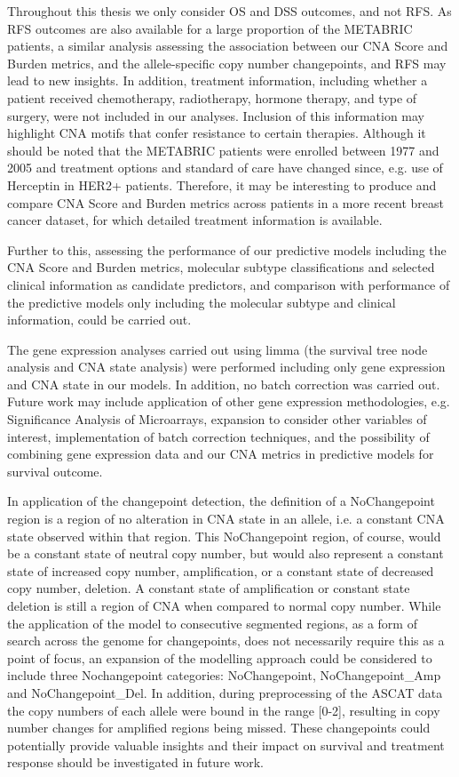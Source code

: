 Throughout this thesis we only consider OS and DSS outcomes, and not RFS. As RFS outcomes are also available for a large proportion of the METABRIC patients, a similar analysis assessing the association between our CNA Score and Burden metrics, and the allele-specific copy number changepoints, and RFS may lead to new insights. In addition, treatment information, including whether a patient received chemotherapy, radiotherapy, hormone therapy, and type of surgery, were not included in our analyses. Inclusion of this information may highlight CNA motifs that confer resistance to certain therapies. Although it should be noted that the METABRIC patients were enrolled between 1977 and 2005 and treatment options and standard of care have changed since, e.g. use of Herceptin in HER2+ patients. Therefore, it may be interesting to produce and compare CNA Score and Burden metrics across patients in a more recent breast cancer dataset, for which detailed treatment information is available.

Further to this, assessing the performance of our predictive models including the CNA Score and Burden metrics, molecular subtype classifications and selected clinical information as candidate predictors, and comparison with performance of the predictive models only including the molecular subtype and clinical information, could be carried out. 

The gene expression analyses carried out using limma (the survival tree node analysis and CNA state analysis) were performed including only gene expression and CNA state in our models. In addition, no batch correction was carried out. Future work may include application of other gene expression methodologies, e.g. Significance Analysis of Microarrays, expansion to consider other variables of interest, implementation of batch correction techniques, and the possibility of combining gene expression data and our CNA metrics in predictive models for survival outcome.     

In application of the changepoint detection, the definition of a NoChangepoint region is a region of no alteration in CNA state in an allele, i.e. a constant CNA state observed within that region. This NoChangepoint region, of course, would be a constant state of neutral copy number, but would also represent a constant state of increased copy number, amplification, or a constant state of decreased copy number, deletion. A constant state of amplification or constant state deletion is still a region of CNA when compared to normal copy number. While the application of the model to consecutive segmented regions, as a form of search across the genome for changepoints, does not necessarily require this as a point of focus, an expansion of the modelling approach could be considered to include three Nochangepoint categories: NoChangepoint, NoChangepoint\_Amp and NoChangepoint\_Del. In addition, during preprocessing of the ASCAT data the copy numbers of each allele were bound in the range [0-2], resulting in copy number changes for amplified regions being missed. These changepoints could potentially provide valuable insights and their impact on survival and treatment response should be investigated in future work. 

